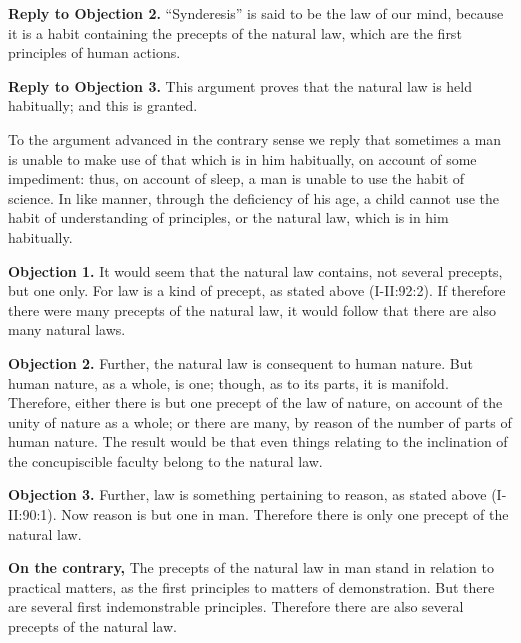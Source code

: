 \textbf{Reply to Objection 2.} ``Synderesis'' is said to be the law of our mind, because it is a habit containing the precepts of the natural law, which are the first principles of human actions.

\textbf{Reply to Objection 3.} This argument proves that the natural law is held habitually; and this is granted.

To the argument advanced in the contrary sense we reply that sometimes a man is unable to make use of that which is in him habitually, on account of some impediment: thus, on account of sleep, a man is unable to use the habit of science. In like manner, through the deficiency of his age, a child cannot use the habit of understanding of principles, or the natural law, which is in him habitually.


\textbf{Objection 1.} It would seem that the natural law contains, not several precepts, but one only. For law is a kind of precept, as stated above (I-II:92:2). If therefore there were many precepts of the natural law, it would follow that there are also many natural laws.

\textbf{Objection 2.} Further, the natural law is consequent to human nature. But human nature, as a whole, is one; though, as to its parts, it is manifold. Therefore, either there is but one precept of the law of nature, on account of the unity of nature as a whole; or there are many, by reason of the number of parts of human nature. The result would be that even things relating to the inclination of the concupiscible faculty belong to the natural law.

\textbf{Objection 3.} Further, law is something pertaining to reason, as stated above (I-II:90:1). Now reason is but one in man. Therefore there is only one precept of the natural law.

\textbf{On the contrary,} The precepts of the natural law in man stand in relation to practical matters, as the first principles to matters of demonstration. But there are several first indemonstrable principles. Therefore there are also several precepts of the natural law.

